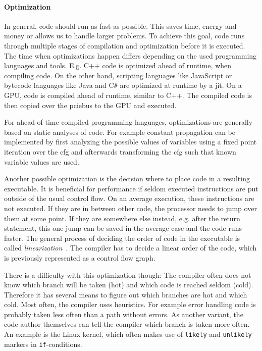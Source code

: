 \paragraph{Optimization} In general, code should run as fast as possible. This saves time, energy and money or allows us to handle larger problems.
To achieve this goal, code runs through multiple stages of compilation and optimization before it is executed.
The time when optimizations happen differs depending on the used programming languages and tools.
E.g. C++ code is optimized ahead of runtime, when compiling code. On the other hand, scripting languages like JavaScript or bytecode languages like Java and C\texttt{\#} are optimized at runtime by a \gls{jit}.
On a GPU, code is compiled ahead of runtime, similar to C++. The compiled code is then copied over the \gls{pciebus} to the GPU and executed.

For ahead-of-time compiled programming languages, optimizations are generally based on static analyses of code. For example constant propagation can be implemented by first analyzing the possible values of variables using a fixed point iteration over the \gls{cfg} and afterwards transforming the \gls{cfg} such that known variable values are used.~\cite{Seidl2010}

Another possible optimization is the decision where to place code in a resulting executable.
It is beneficial for performance if seldom executed instructions are put outside of the usual control flow.
On an average execution, these instructions are not executed.
If they are in between other code, the processor needs to jump over them at some point.
If they are somewhere else instead, e.g. after the return statement, this one jump can be saved in the average case and the code runs faster.
The general process of deciding the order of code in the executable is called \emph{linearization}~\cite{Seidl2010}.
The compiler has to decide a linear order of the code, which is previously represented as a control flow graph.

There is a difficulty with this optimization though: The compiler often does not know which branch will be taken (hot) and which code is reached seldom (cold). Therefore it has several means to figure out which branches are hot and which cold. Most often, the compiler uses heuristics. For example error handling code is probably taken less often than a path without errors. As another variant, the code author themselves can tell the compiler which branch is taken more often. An example is the Linux kernel, which often makes use of \texttt{likely} and \texttt{unlikely} markers in \texttt{if}-conditions.

